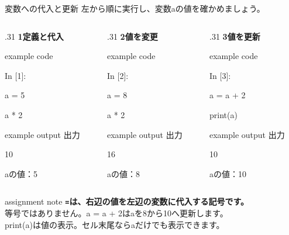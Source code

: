 \documentclass[12pt,aspectratio=43]{beamer}
\newcommand{\pythonexample}[4]{%
  \begin{beamercolorbox}[wd=\linewidth,sep=1.8mm]{example code}
    {\codefont\fontsize{9}{10}\selectfont\textcolor{courseblue}{In [#1]:}\par}
    \begingroup\codefont\fontsize{16}{18}\selectfont
      \strut#2\\
      \strut#3\par
    \endgroup
  \end{beamercolorbox}\par
  \begin{beamercolorbox}[wd=\linewidth,sep=.5mm,leftskip=1.3mm]{example output}
    {\fontsize{9}{11}\selectfont\textcolor{black!65}{出力}}\quad
    {\codefont\fontsize{16}{18}\selectfont\strut#4}
  \end{beamercolorbox}}
\begin{document}
\begin{frame}[t]{変数への代入と更新}
  \setlength{\parskip}{0pt}
  左から順に実行し、変数{\codefont a}の値を確かめましょう。
  \par\vspace{1mm}
  \begin{columns}[T,onlytextwidth]
    \begin{column}{.31\textwidth}
      \textcolor{courseblue}{\textbf{1\quad 定義と代入}}
      \pythonexample{1}
        {a = \textcolor{codevalue}{5}}
        {a * \textcolor{codevalue}{2}}{10}
      \par\vspace{1mm}
      {\small {\codefont a}の値：{\codefont\textcolor{codevalue}{5}}\par}
    \end{column}
    \begin{column}{.31\textwidth}
      \textcolor{courseblue}{\textbf{2\quad 値を変更}}
      \pythonexample{2}
        {a = \textcolor{codevalue}{8}}
        {a * \textcolor{codevalue}{2}}{16}
      \par\vspace{1mm}
      {\small {\codefont a}の値：{\codefont\textcolor{codevalue}{8}}\par}
    \end{column}
    \begin{column}{.31\textwidth}
      \textcolor{courseblue}{\textbf{3\quad 値を更新}}
      \pythonexample{3}
        {a = a + \textcolor{codevalue}{2}}
        {\textcolor{codebuiltin}{print}(a)}{10}
      \par\vspace{1mm}
      {\small {\codefont a}の値：{\codefont\textcolor{codevalue}{10}}\par}
    \end{column}
  \end{columns}
  \vspace{1mm}
  \begin{beamercolorbox}[wd=\textwidth,sep=1.5mm]{assignment note}
    \textbf{\texttt{=}は、右辺の値を左辺の変数に代入する記号です。}\\
    {\small 等号ではありません。{\codefont a = a + 2}は{\codefont a}を8から10へ更新します。\\
    {\codefont print(a)}は値の表示。セル末尾なら{\codefont a}だけでも表示できます。}
  \end{beamercolorbox}
\end{frame}
\end{document}
